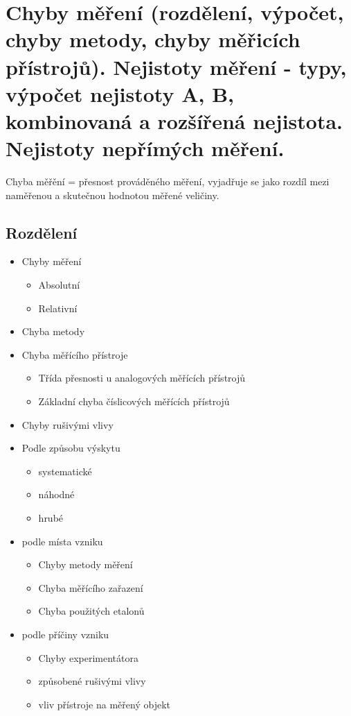 \section{Chyby měření (rozdělení, výpočet, chyby metody, chyby měřicích přístrojů). Nejistoty měření - typy, výpočet nejistoty A, B, kombinovaná a rozšířená nejistota. Nejistoty nepřímých měření.}
Chyba měřění = přesnost prováděného měření, vyjadřuje se jako rozdíl mezi naměřenou a skutečnou hodnotou měřené veličiny.
\subsection*{Rozdělení}
\begin{itemize}
    \item Chyby měření
          \begin{itemize}
              \item Absolutní
              \item Relativní
          \end{itemize}
    \item Chyba metody
    \item Chyba měřícího přístroje
          \begin{itemize}
              \item Třída přesnosti u analogových měřících přístrojů
              \item Základní chyba číslicových měřících přístrojů
          \end{itemize}
    \item Chyby rušivými vlivy
    \item Podle způsobu výskytu
          \begin{itemize}
              \item systematické
              \item náhodné
              \item hrubé
          \end{itemize}
    \item podle místa vzniku
          \begin{itemize}
              \item Chyby metody měření
              \item Chyba měřícího zařazení
              \item Chyba použitých etalonů
          \end{itemize}
    \item podle příčiny vzniku
          \begin{itemize}
              \item Chyby experimentátora
              \item způsobené rušivými vlivy
              \item vliv přístroje na měřený objekt
          \end{itemize}
\end{itemize}
\newpage
